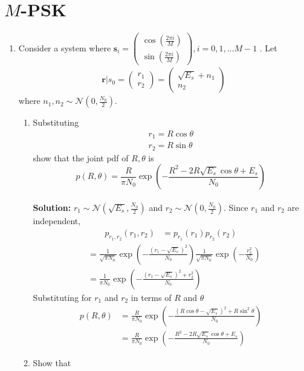 \documentclass[journal,10pt,twocolumn]{IEEEtran}
\providecommand{\brak}[1]{\ensuremath{\left(#1\right)}}
\newcommand{\solution}{\noindent \textbf{Solution: }}
\newcommand{\myvec}[1]{\ensuremath{\begin{pmatrix}#1\end{pmatrix}}}
\providecommand{\gauss}[2]{\mathcal{N}\ensuremath{\left(#1,#2\right)}}
\begin{document}
\section{$M$-PSK}
\begin{enumerate}

\item
Consider a system where 
$\mathbf{s}_i=
\myvec{
\cos\brak{\frac{2\pi i}{M}}\\
\sin\brak{\frac{2\pi i}{M}}
}, i = 0, 1 , \dots M-1
$
.
Let
%
\begin{align}
\mathbf{r}|s_0 = 
\myvec{
r_1\\
r_2
}
=
\myvec{
\sqrt{E_s}+n_1\\
n_2
}
\end{align}
where $n_1,n_2 \sim \mathcal{N}\brak{0,\frac{N_0}{2}}$.

\begin{enumerate}[label=(\alph{enumii})]
\item Substituting 
\label{prob:mpsk_polar_joint_pdf}
\begin{align}
r_1=R\cos \theta \\
r_2=R\sin \theta
\end{align}
show that the joint pdf of $R,\theta$ is
%
\begin{equation}
p\brak{R,\theta}=\frac{R}{\pi N_0}\exp\brak{-\frac{R^2-2R\sqrt{E_s}\cos \theta + E_s}{N_0}}
\label{eq:mpsk_joint_pdf_polar}
\end{equation}\\
\solution $r_1 \sim \gauss{\sqrt{E_s}}{\frac{N_0}{2}}$ and $r_2 \sim \gauss{0}{\frac{N_0}{2}}$. Since $r_1$ and $r_2$ are independent,
\begin{align*}
	p_{r_1,r_2}(r_1,r_2) &= p_{r_1}(r_1)p_{r_2}(r_2)
\end{align*}
\begin{align*}
	&= \frac{1}{\sqrt{\pi N_0}}\exp\left(-\frac{(r_1-\sqrt{E_s})^2}{N_0}\right)\frac{1}{\sqrt{\pi N_0}}\exp\left(-\frac{r_2^2}{N_0}\right)\\
	&= \frac{1}{\pi N_0}\exp\left(-\frac{(r_1-\sqrt{E_s})^2+r_2^2}{N_0}\right)
\end{align*}
Substituting for $r_1$ and $r_2$ in terms of $R$ and $\theta$
\begin{align*}
	p\brak{R,\theta} &= \frac{R}{\pi N_0}\exp\left(-\frac{(R\cos\theta - \sqrt{E_s})^2+R\sin^2\theta}{N_0}\right)\\
	&= \frac{R}{\pi N_0}\exp\brak{-\frac{R^2-2R\sqrt{E_s}\cos \theta + E_s}{N_0}}
\end{align*}
%
\item Show that 

\end{enumerate}
\end{enumerate}
\end{document}
